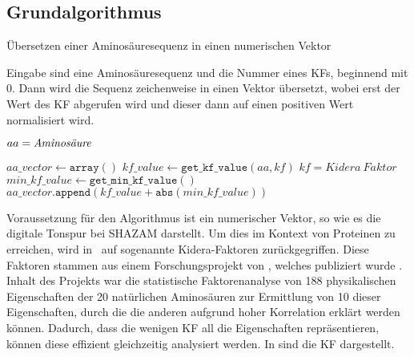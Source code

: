     \subsection{Grundalgorithmus} %
        \label{sub:grundalgorithmus}
        \begin{algorithm}[H]
            \caption{Übersetzen einer Aminosäuresequenz in einen numerischen Vektor}\label{alg:vorbereitung}
            Eingabe sind eine Aminosäuresequenz und die Nummer eines \acl{KF}s, beginnend mit 0. Dann wird die Sequenz zeichenweise in einen Vektor übersetzt, wobei erst der Wert des \ac{KF} abgerufen wird und dieser dann auf einen positiven Wert normalisiert wird.
            \newcommand{\I}{\text{\textquotesingle}}
            \begin{algorithmic}[1]

                \myRequire{
                    $sequence \in \{ \text{A-Z}, \I\Psi\I, \I\Omega\I, \I\Phi\I, \I\zeta\I, \I\Pi\I, \I\text{+}\I, \I\text{-}\I\}^{*} $\\
                    $0 \leq kf \leq 9$
                }
                \Comment $aa = \emph{Aminosäure}$

                \State $aa\_vector \gets \texttt{array}()$
                    \State $kf\_value \gets \texttt{get\_kf\_value}(aa, kf)$ \Comment $kf=Kidera\ Faktor$
                    \State $min\_kf\_value \gets \texttt{get\_min\_kf\_value}()$
                    \State $aa\_vector.\texttt{append}(kf\_value + \texttt{abs}(min\_kf\_value))$
                \EndFor
            \end{algorithmic}
        \end{algorithm}
        Voraussetzung für den Algorithmus ist ein numerischer Vektor, so wie es die digitale Tonspur bei SHAZAM darstellt. Um dies im Kontext von Proteinen zu erreichen, wird in \protfin\ auf sogenannte Kidera-Faktoren zurückgegriffen. Diese Faktoren stammen aus einem Forschungsprojekt von \citeauthor{kidera}, welches  publiziert wurde \autocite{kidera}. Inhalt des Projekts war die statistische Faktorenanalyse von 188 physikalischen Eigenschaften der 20 natürlichen Aminosäuren zur Ermittlung von 10 dieser Eigenschaften, durch die die anderen aufgrund hoher Korrelation erklärt werden können. Dadurch, dass die wenigen \ac{KF} all die Eigenschaften repräsentieren, können diese effizient gleichzeitig analysiert werden. In  sind die \ac{KF} dargestellt.

